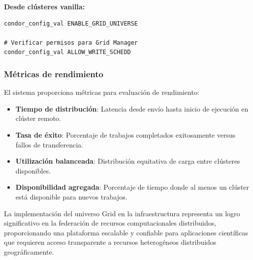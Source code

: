 \textbf{Desde clústeres vanilla:}

\begin{verbatim}
condor_config_val ENABLE_GRID_UNIVERSE

# Verificar permisos para Grid Manager
condor_config_val ALLOW_WRITE_SCHEDD
\end{verbatim}

\subsubsection{Métricas de rendimiento}
\noindent

El sistema proporciona métricas para evaluación de rendimiento:

\begin{itemize}
	\item \textbf{Tiempo de distribución}: Latencia desde envío hasta inicio de ejecución en clúster remoto.

	\item \textbf{Tasa de éxito}: Porcentaje de trabajos completados exitosamente versus fallos de transferencia.

	\item \textbf{Utilización balanceada}: Distribución equitativa de carga entre clústeres disponibles.

	\item \textbf{Disponibilidad agregada}: Porcentaje de tiempo donde al menos un clúster está disponible para nuevos trabajos.
\end{itemize}

La implementación del universo Grid en la infraestructura \GRID representa un logro significativo en la federación de recursos computacionales distribuidos, proporcionando una plataforma escalable y confiable para aplicaciones científicas que requieren acceso transparente a recursos heterogéneos distribuidos geográficamente.
